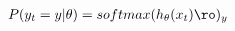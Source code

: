 \documentclass[preview]{standalone}
\begin{document}
\begin{align*}
P(y_t = y | \theta) = softmax(h_{\theta}(x_t)\/ \ro)_y
\end{align*}
\end{document}

